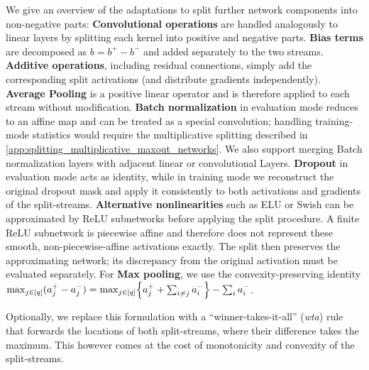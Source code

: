 We give an overview of the adaptations to split further network components into non-negative parts:
\textbf{Convolutional operations} are handled analogously to linear layers by splitting each kernel into positive and negative parts.
\textbf{Bias terms} are decomposed as \(b=b^+-b^-\) and added separately to the two streams. 
\textbf{Additive operations}, including residual connections, simply add the corresponding split activations (and distribute gradients independently).
\textbf{Average Pooling} is a positive linear operator and is therefore applied to each stream without modification.
\textbf{Batch normalization} in evaluation mode reduces to an affine map and can be treated as a special convolution; handling training-mode statistics would require the multiplicative splitting described in \cref{app:splitting_multiplicative_maxout_networks}. We also support merging Batch normalization layers with adjacent linear or convolutional Layers.
\textbf{Dropout} in evaluation mode acts as identity, while in training mode we reconstruct the original dropout mask and apply it consistently to both activations and gradients of the split-streams.
\textbf{Alternative nonlinearities} such as ELU \cite{Clevert2016_elu} or Swish \cite{Ramachandran2017_swish} can be approximated by ReLU subnetworks before applying the split procedure. A finite ReLU subnetwork is piecewise affine and therefore does not represent these smooth, non-piecewise-affine activations exactly. The split then preserves the approximating network; its discrepancy from the original activation must be evaluated separately. 
For \textbf{Max pooling}, we use the convexity-preserving identity $\max_{j\in[q]}(a_j^+ - a_j^-) = \max_{j\in[q]}\Bigl\{a_j^+ + \sum_{i\neq j} a_i^- \Bigr\} - \sum_{i} a_i^-$.

Optionally, we replace this formulation with a ``winner-takes-it-all'' (\emph{wta}) rule that forwards the locations of both split-streams, where their difference takes the maximum. This however comes at the cost of monotonicity and convexity of the split-streams.
